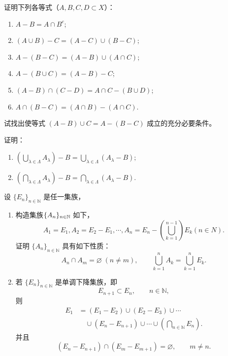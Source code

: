 \begin{exercise}
	\item 证明下列各等式（$A, B, C, D \subset X$）：
	\begin{enumerate}[label=\arabic*)]
		\item $A-B=A \cap B^c$;
		\item $(A \cup B)-C=(A-C)\cup(B-C)$;
		\item $A-(B-C)=(A-B) \cup (A \cap C)$;
		\item $A-(B \cup C)=(A-B)-C$;
		\item $(A-B) \cap (C-D)=A \cap C-(B \cup D)$;
		\item $A \cap (B-C)=(A \cap B)-(A \cap C)$.
	\end{enumerate}
\end{exercise}





\begin{exercise}
	\item 试找出使等式 \((A-B)\cup C=A-(B-C)\) 成立的充分必要条件。
\end{exercise}

\begin{exercise}	
	\item 证明：
	\begin{enumerate}[label=\roman*)]
		\item \(\displaystyle
		\left(\bigcup_{\lambda\in\Lambda}A_\lambda\right)-B
		=\bigcup_{\lambda\in\Lambda}(A_\lambda-B);\)
		\item \(\displaystyle
		\left(\bigcap_{\lambda\in\Lambda}A_\lambda\right)-B
		=\bigcap_{\lambda\in\Lambda}(A_\lambda-B).\)
	\end{enumerate}
\end{exercise}	
	
\begin{exercise}
	\item 设 \(\{E_n\}_{n\in\mathbb{N}}\) 是任一集族，
	
	\begin{enumerate}[label=\arabic*)]
	
	\item 构造集族$\{A_n\}_{n\in\mathbb{N}}$ 如下，
	\[
	A_1 = E_1,A_2 = E_2-E_1,\cdots,
	A_n = E_n - (\bigcup_{k=1}^{n-1}) E_k (n\in N).
	\]
	证明 \(\{A_n\}_{n\in\mathbb{N}}\) 具有如下性质：
	\[
	A_n\cap A_m=\varnothing\;(n\ne m),\qquad
	\bigcup_{k=1}^{n}A_k=\bigcup_{k=1}^{n}E_k.
	\]
	
	\item 若 \(\{E_n\}_{n\in\mathbb N}\) 是单调下降集族，即
	\[
	E_{n+1} \subset E_n,\qquad n\in\mathbb N,
	\]
	则
	\[
	\begin{aligned}
		E_1
		&=(E_1-E_2)\cup(E_2-E_3)\cup\cdots\\
		&\quad{}\cup(E_n - E_{n+1})\cup\cdots
		\cup\left(\bigcap_{n\in\mathbb N}E_n\right).
	\end{aligned}
	\]
	并且
	\[
	(E_n - E_{n+1})
	\cap
	(E_m - E_{m+1})
	=\varnothing,
	\qquad m\ne n.
	\]
	
\end{enumerate}
\end{exercise}

